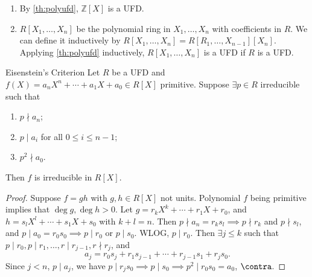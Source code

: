 \begin{example}
    \leavevmode
    \begin{enumerate}
        \item By \cref{th:polyufd}, \(\mathbb{Z}[X]\) is a UFD.
        \item \(R[X_1, \ldots, X_n]\) be the polynomial ring in \(X_1, \ldots, X_n\) with coefficients in \(R\). We can define it inductively by \(R[X_1, \ldots, X_n] = R[R_1, \ldots, X_{n-1}][X_n]\). Applying \cref{th:polyufd} inductively, \(R[X_1, \ldots, X_n]\) is a UFD if \(R\) is a UFD.
    \end{enumerate}
\end{example}
\begin{theorem}{Eisenstein's Criterion}{}
    Let \(R\) be a UFD and \(f(X) = a_n X^n + \cdots + a_1 X + a_0 \in R[X]\) primitive. Suppose \(\exists p \in R\) irreducible such that
    \begin{enumerate}
        \item \(p \nmid a_n\);
        \item \(p \mid a_i\) for all \(0 \leq i \leq n - 1\);
        \item \(p^2 \nmid a_0\).
    \end{enumerate}
    Then \(f\) is irreducible in \(R[X]\).
\end{theorem}
\begin{proof}
    Suppose \(f = gh\) with \(g, h \in R[X]\) not units. Polynomial \(f\) being primitive implies that \(\deg g, \deg h > 0\). Let \(g = r_k X^k + \cdots + r_1 X + r_0\), and \(h = s_l X^l + \cdots + s_1 X + s_0\) with \(k + l = n\). Then \(p \nmid a_n = r_k s_l \implies p \nmid r_k\) and \(p \nmid s_l\), and \(p \mid a_0 = r_0 s_0\implies p \mid r_0\) or \(p \mid s_0\). WLOG, \(p \mid r_0\). Then \(\exists j \leq k\) such that \(p \mid r_0, p \mid r_1, \ldots, r\mid r_{j-1}, r\nmid r_j\), and
    \[
        a_j = r_0 s_j + r_1 s_{j-1} + \cdots + r_{j-1}s_1 + r_j s_0.
    \]
    Since \(j < n\), \(p\mid a_j\), we have \(p \mid r_j s_0 \implies p \mid s_0 \implies p^2 \mid r_0 s_0 = a_0\), \(\contra\).
\end{proof}
